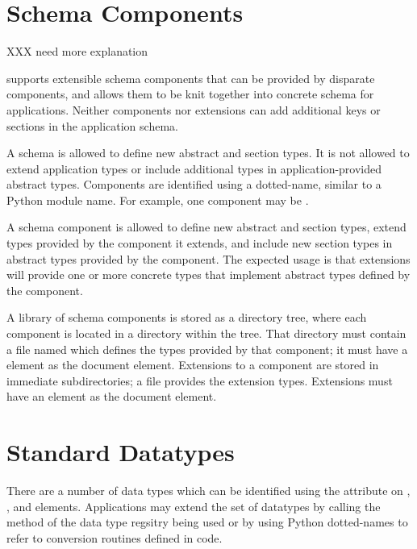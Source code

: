 \documentclass{howto}
\begin{document}
\section{Schema Components \label{schema-components}}

XXX need more explanation

 supports extensible schema components that can be
provided by disparate components, and allows them to be knit together
into concrete schema for applications.  Neither components nor
extensions can add additional keys or sections in the application
schema.

A schema  is allowed to define new abstract and
section types.  It is not allowed to extend application types or
include additional types in application-provided abstract types.
Components are identified using a dotted-name, similar to a Python
module name.  For example, one component may be .

A schema component  is allowed to define new abstract
and section types, extend types provided by the component it extends,
and include new section types in abstract types provided by the
component.  The expected usage is that extensions will provide one or
more concrete types that implement abstract types defined by the
component.

A library of schema components is stored as a directory tree, where
each component is located in a directory within the tree.  That
directory must contain a file named  which defines
the types provided by that component; it must have a
 element as the document element.  Extensions to a
component are stored in immediate subdirectories; a file
 provides the extension types.  Extensions must
have an  element as the document element.


\section{Standard  Datatypes\label{standard-datatypes}}

There are a number of data types which can be identified using the
 attribute on ,
, and  elements.
Applications may extend the set of datatypes by calling the
 method of the data type regsitry being used or by
using Python dotted-names to refer to conversion routines defined in
code.
\end{document}

